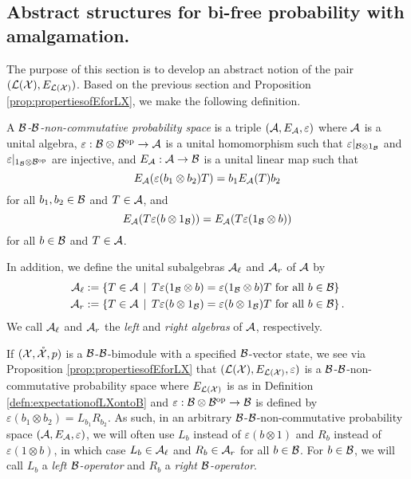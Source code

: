 \subsection{Abstract structures for bi-free probability with amalgamation.}

The purpose of this section is to develop an abstract notion of the pair $(\mathcal{L}(\mathcal{X}), E_{\mathcal{L}(\mathcal{X})})$.
Based on the previous section and Proposition \ref{prop:propertiesofEforLX}, we make the following definition.
\begin{definition}
	\label{defn:BBncps}
	A \emph{$\mathcal{B}$-$\mathcal{B}$-non-commutative probability space} is a triple $(\mathcal{A}, E_{\mathcal{A}}, \varepsilon)$ where $\mathcal{A}$ is a unital algebra, $\varepsilon : \mathcal{B} \otimes \mathcal{B}^{\mathrm{op}} \to \mathcal{A}$ is a unital homomorphism such that $\varepsilon|_{\mathcal{B} \otimes 1_{\mathcal{B}}}$ and $\varepsilon|_{1_{\mathcal{B}} \otimes \mathcal{B}^{\mathrm{op}}}$ are injective, and $E_{\mathcal{A}} : \mathcal{A} \to \mathcal{B}$ is a unital linear map such that
	\[
		E_{\mathcal{A}}(\varepsilon(b_1 \otimes b_2)T) = b_1 E_{\mathcal{A}}(T) b_2
	\]
	for all $b_1, b_2 \in \mathcal{B}$ and $T \in \mathcal{A}$, and
	\[
		E_{\mathcal{A}}(T\varepsilon(b \otimes 1_{\mathcal{B}})) = E_{\mathcal{A}}(T\varepsilon(1_{\mathcal{B}} \otimes b))
	\]
	for all $b \in \mathcal{B}$ and $T \in \mathcal{A}$.

	In addition, we define the unital subalgebras $\mathcal{A}_\ell$ and $\mathcal{A}_r$ of $\mathcal{A}$ by
	\begin{align*}
		\mathcal{A}_\ell &:= \left\{ T \in \mathcal{A}
		\, \mid \, T\varepsilon(1_{\mathcal{B}} \otimes b) = \varepsilon(1_{\mathcal{B}} \otimes b) T \text{ for all }b \in \mathcal{B}\right\}\\
		\mathcal{A}_r &:= \left\{ T \in \mathcal{A}
		\, \mid \, T\varepsilon(b \otimes 1_{\mathcal{B}}) = \varepsilon(b \otimes 1_{\mathcal{B}}) T \text{ for all }b \in \mathcal{B}\right\}.
	\end{align*}
	We call $\mathcal{A}_\ell$ and $\mathcal{A}_r$ the \emph{left} and \emph{right algebras} of $\mathcal{A}$, respectively.
\end{definition}

If $(\mathcal{X}, \mathring{\mathcal{X}}, p)$ is a $\mathcal{B}$-$\mathcal{B}$-bimodule with a specified $\mathcal{B}$-vector state, we see via Proposition \ref{prop:propertiesofEforLX} that $(\mathcal{L}(\mathcal{X}), E_{\mathcal{L}(\mathcal{X})}, \varepsilon)$ is a $\mathcal{B}$-$\mathcal{B}$-non-commutative probability space where $E_{\mathcal{L}(\mathcal{X})}$ is as in Definition \ref{defn:expectationofLXontoB} and $\varepsilon : \mathcal{B} \otimes \mathcal{B}^{\mathrm{op}} \to \mathcal{B}$ is defined by $\varepsilon(b_1 \otimes b_2) = L_{b_1} R_{b_2}$.
As such, in an arbitrary $\mathcal{B}$-$\mathcal{B}$-non-commutative probability space $(\mathcal{A}, E_{\mathcal{A}}, \varepsilon)$, we will often use
$L_b$ instead of $\varepsilon(b \otimes 1)$ and $R_b$ instead of $\varepsilon(1 \otimes b)$, in which case $L_b \in \mathcal{A}_\ell$ and $R_b \in \mathcal{A}_r$ for all $b \in \mathcal{B}$.
For $b \in \mathcal{B}$, we will call $L_b$ a \emph{left $\mathcal{B}$-operator} and $R_b$ a \emph{right $\mathcal{B}$-operator}.


